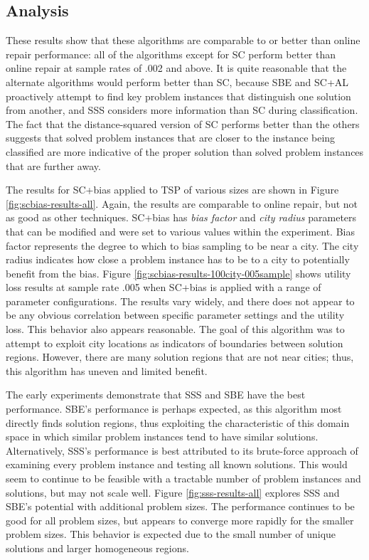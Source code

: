 \subsection{Analysis}

These results show that these algorithms are comparable to or better than online repair performance:  all of the algorithms except for SC perform better than online repair at sample rates of .002 and above.  It is quite reasonable that the alternate algorithms would perform better than SC, because SBE and SC+AL proactively attempt to find key problem instances that distinguish one solution from another, and SSS considers more information than SC during classification.  The fact that the distance-squared version of SC performs better than the others suggests that solved problem instances that are closer to the instance being classified are more indicative of the proper solution than solved problem instances that are further away.

The results for SC+bias applied to TSP of various sizes are shown in Figure \ref{fig:scbias-results-all}.  Again, the results are comparable to online repair, but not as good as other techniques.  SC+bias has \textit{bias factor} and \textit{city radius} parameters that can be modified and were set to various values within the experiment.  Bias factor represents the degree to which to bias sampling to be near a city.  The city radius indicates how close a problem instance has to be to a city to potentially benefit from the bias.  Figure \ref{fig:scbias-results-100city-005sample} shows utility loss results at sample rate .005 when SC+bias is applied with a range of parameter configurations.  The results vary widely, and there does not appear to be any obvious correlation between specific parameter settings and the utility loss.  This behavior also appears reasonable.  The goal of this algorithm was to attempt to exploit city locations as indicators of boundaries between solution regions.  However, there are many solution regions that are not near cities; thus, this algorithm has uneven and limited benefit.

The early experiments demonstrate that SSS and SBE have the best performance.  SBE's performance is perhaps expected, as this algorithm most directly finds solution regions, thus exploiting the characteristic of this domain space in which similar problem instances tend to have similar solutions.  Alternatively, SSS's performance is best attributed to its brute-force approach of examining every problem instance and testing all known solutions.  This would seem to continue to be feasible with a tractable number of problem instances and solutions, but may not scale well.  Figure \ref{fig:sss-results-all} explores SSS and SBE's potential with additional problem sizes.  The performance continues to be good for all problem sizes, but appears to converge more rapidly for the smaller problem sizes.  This behavior is expected due to the small number of unique solutions and larger homogeneous regions.



